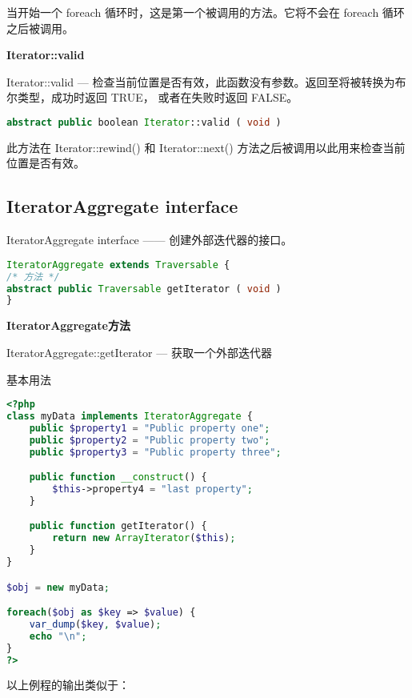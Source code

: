 当开始一个 foreach 循环时，这是第一个被调用的方法。它将不会在 foreach 循环之后被调用。


\textbf{Iterator::valid}

Iterator::valid — 检查当前位置是否有效，此函数没有参数。返回至将被转换为布尔类型，成功时返回 TRUE， 或者在失败时返回 FALSE。

\begin{lstlisting}[language=PHP]
abstract public boolean Iterator::valid ( void )
\end{lstlisting}

此方法在 Iterator::rewind() 和 Iterator::next() 方法之后被调用以此用来检查当前位置是否有效。


\subsection{IteratorAggregate interface}

IteratorAggregate interface —— 创建外部迭代器的接口。


\begin{lstlisting}[language=PHP]
IteratorAggregate extends Traversable {
/* 方法 */
abstract public Traversable getIterator ( void )
}
\end{lstlisting}


\textbf{IteratorAggregate方法}

\begin{compactitem}
\item IteratorAggregate::getIterator — 获取一个外部迭代器
\end{compactitem}

\begin{example}
基本用法
\begin{lstlisting}[language=PHP]
<?php
class myData implements IteratorAggregate {
    public $property1 = "Public property one";
    public $property2 = "Public property two";
    public $property3 = "Public property three";

    public function __construct() {
        $this->property4 = "last property";
    }

    public function getIterator() {
        return new ArrayIterator($this);
    }
}

$obj = new myData;

foreach($obj as $key => $value) {
    var_dump($key, $value);
    echo "\n";
}
?>
\end{lstlisting}
\end{example}

以上例程的输出类似于：

